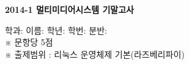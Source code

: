\documentclass[A4paper,chapter,footnote,5pt]{oblivoir}
\begin{document}

\begin{center}
\large\textbf{ 2014-1 멀티미디어시스템 기말고사}\\
\end{center}
학과:\hspace{25 mm}   이름:\hspace{25 mm}   학년: \hspace{25 mm}   학번: \hspace{25 mm}  분반:\hspace{25 mm}
\\
※ 문항당 5점 \\
※ 출제범위 : 리눅스 운영체제 기본(라즈베리파이)
\end{document}
